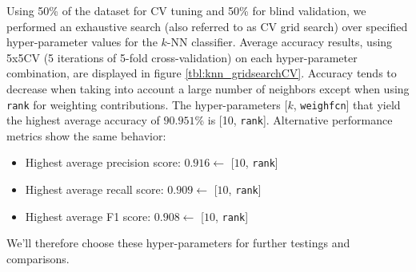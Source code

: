 Using 50\% of the dataset for CV tuning and 50\% for blind validation, we performed an exhaustive search (also referred to as CV grid search) over specified hyper-parameter values for the $k$-NN classifier. Average accuracy results, using 5x5CV (5 iterations of 5-fold cross-validation) on each hyper-parameter combination, are displayed in figure \ref{tbl:knn_gridsearchCV}. Accuracy tends to decrease when taking into account a large number of neighbors except when using \texttt{rank} for weighting contributions. The hyper-parameters [$k$, \texttt{weighfcn}] that yield the highest average accuracy of $90.951$\% is [10, \texttt{rank}]. Alternative performance metrics show the same behavior:
\begin{itemize}
	\item Highest average precision score: $0.916 \gets$ [$10$, \texttt{rank}]
	\item Highest average recall score: $0.909 \gets$ [$10$, \texttt{rank}]
	\item Highest average F1 score: $0.908 \gets$ [$10$, \texttt{rank}]
\end{itemize}
We'll therefore choose these hyper-parameters for further testings and comparisons.
